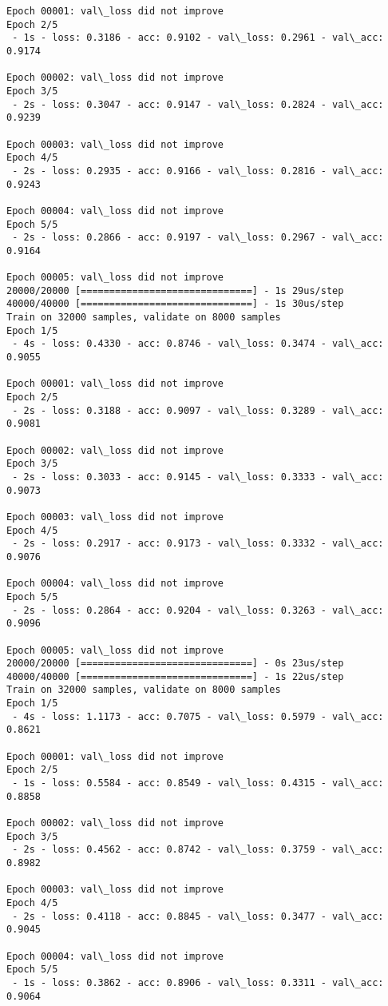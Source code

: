 \documentclass[11pt]{article}
\begin{document}
\begin{Verbatim}[commandchars=\\\{\}]
Epoch 00001: val\_loss did not improve
Epoch 2/5
 - 1s - loss: 0.3186 - acc: 0.9102 - val\_loss: 0.2961 - val\_acc: 0.9174

Epoch 00002: val\_loss did not improve
Epoch 3/5
 - 2s - loss: 0.3047 - acc: 0.9147 - val\_loss: 0.2824 - val\_acc: 0.9239

Epoch 00003: val\_loss did not improve
Epoch 4/5
 - 2s - loss: 0.2935 - acc: 0.9166 - val\_loss: 0.2816 - val\_acc: 0.9243

Epoch 00004: val\_loss did not improve
Epoch 5/5
 - 2s - loss: 0.2866 - acc: 0.9197 - val\_loss: 0.2967 - val\_acc: 0.9164

Epoch 00005: val\_loss did not improve
20000/20000 [==============================] - 1s 29us/step
40000/40000 [==============================] - 1s 30us/step
Train on 32000 samples, validate on 8000 samples
Epoch 1/5
 - 4s - loss: 0.4330 - acc: 0.8746 - val\_loss: 0.3474 - val\_acc: 0.9055

Epoch 00001: val\_loss did not improve
Epoch 2/5
 - 2s - loss: 0.3188 - acc: 0.9097 - val\_loss: 0.3289 - val\_acc: 0.9081

Epoch 00002: val\_loss did not improve
Epoch 3/5
 - 2s - loss: 0.3033 - acc: 0.9145 - val\_loss: 0.3333 - val\_acc: 0.9073

Epoch 00003: val\_loss did not improve
Epoch 4/5
 - 2s - loss: 0.2917 - acc: 0.9173 - val\_loss: 0.3332 - val\_acc: 0.9076

Epoch 00004: val\_loss did not improve
Epoch 5/5
 - 2s - loss: 0.2864 - acc: 0.9204 - val\_loss: 0.3263 - val\_acc: 0.9096

Epoch 00005: val\_loss did not improve
20000/20000 [==============================] - 0s 23us/step
40000/40000 [==============================] - 1s 22us/step
Train on 32000 samples, validate on 8000 samples
Epoch 1/5
 - 4s - loss: 1.1173 - acc: 0.7075 - val\_loss: 0.5979 - val\_acc: 0.8621

Epoch 00001: val\_loss did not improve
Epoch 2/5
 - 1s - loss: 0.5584 - acc: 0.8549 - val\_loss: 0.4315 - val\_acc: 0.8858

Epoch 00002: val\_loss did not improve
Epoch 3/5
 - 2s - loss: 0.4562 - acc: 0.8742 - val\_loss: 0.3759 - val\_acc: 0.8982

Epoch 00003: val\_loss did not improve
Epoch 4/5
 - 2s - loss: 0.4118 - acc: 0.8845 - val\_loss: 0.3477 - val\_acc: 0.9045

Epoch 00004: val\_loss did not improve
Epoch 5/5
 - 1s - loss: 0.3862 - acc: 0.8906 - val\_loss: 0.3311 - val\_acc: 0.9064


\end{Verbatim}
\end{document}
